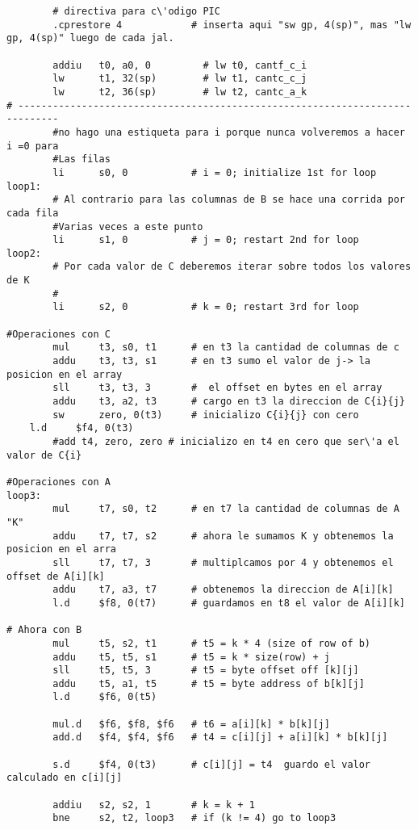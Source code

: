 \documentclass[a4paper,10pt]{article}
\begin{document}
\begin{lstlisting}
        # directiva para c\'odigo PIC
        .cprestore 4            # inserta aqui "sw gp, 4(sp)", mas "lw gp, 4(sp)" luego de cada jal.

        addiu   t0, a0, 0         # lw t0, cantf_c_i
        lw      t1, 32(sp)        # lw t1, cantc_c_j
        lw      t2, 36(sp)        # lw t2, cantc_a_k
# -----------------------------------------------------------------------------
        #no hago una estiqueta para i porque nunca volveremos a hacer i =0 para
        #Las filas
        li      s0, 0           # i = 0; initialize 1st for loop
loop1:
        # Al contrario para las columnas de B se hace una corrida por cada fila
        #Varias veces a este punto
        li      s1, 0           # j = 0; restart 2nd for loop
loop2:
        # Por cada valor de C deberemos iterar sobre todos los valores de K
        #
        li      s2, 0           # k = 0; restart 3rd for loop

#Operaciones con C
        mul     t3, s0, t1      # en t3 la cantidad de columnas de c
        addu    t3, t3, s1      # en t3 sumo el valor de j-> la posicion en el array
        sll     t3, t3, 3       #  el offset en bytes en el array
        addu    t3, a2, t3      # cargo en t3 la direccion de C{i}{j}
        sw      zero, 0(t3)     # inicializo C{i}{j} con cero
	l.d     $f4, 0(t3)
        #add t4, zero, zero # inicializo en t4 en cero que ser\'a el valor de C{i}
		
#Operaciones con A
loop3:
        mul     t7, s0, t2      # en t7 la cantidad de columnas de A "K"
        addu    t7, t7, s2      # ahora le sumamos K y obtenemos la posicion en el arra
        sll     t7, t7, 3       # multiplcamos por 4 y obtenemos el offset de A[i][k]
        addu    t7, a3, t7      # obtenemos la direccion de A[i][k]
        l.d     $f8, 0(t7)      # guardamos en t8 el valor de A[i][k]
        
# Ahora con B
        mul     t5, s2, t1      # t5 = k * 4 (size of row of b)
        addu    t5, t5, s1      # t5 = k * size(row) + j
        sll     t5, t5, 3       # t5 = byte offset off [k][j]
        addu    t5, a1, t5      # t5 = byte address of b[k][j]
        l.d     $f6, 0(t5)

        mul.d   $f6, $f8, $f6   # t6 = a[i][k] * b[k][j]
        add.d   $f4, $f4, $f6   # t4 = c[i][j] + a[i][k] * b[k][j]

        s.d     $f4, 0(t3)      # c[i][j] = t4  guardo el valor calculado en c[i][j]

        addiu   s2, s2, 1       # k = k + 1
        bne     s2, t2, loop3   # if (k != 4) go to loop3


\end{lstlisting}
\end{document}
